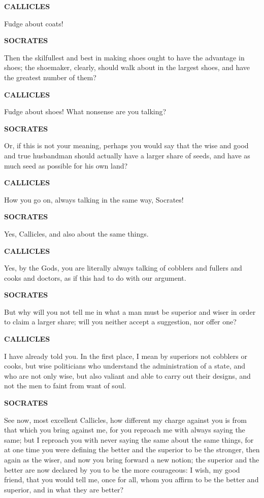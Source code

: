 \documentclass[11pt,letter]{article}
\begin{document}
\par \textbf{CALLICLES}
\par   Fudge about coats!

\par \textbf{SOCRATES}
\par   Then the skilfullest and best in making shoes ought to have the advantage in shoes; the shoemaker, clearly, should walk about in the largest shoes, and have the greatest number of them?

\par \textbf{CALLICLES}
\par   Fudge about shoes! What nonsense are you talking?

\par \textbf{SOCRATES}
\par   Or, if this is not your meaning, perhaps you would say that the wise and good and true husbandman should actually have a larger share of seeds, and have as much seed as possible for his own land?

\par \textbf{CALLICLES}
\par   How you go on, always talking in the same way, Socrates!

\par \textbf{SOCRATES}
\par   Yes, Callicles, and also about the same things.

\par \textbf{CALLICLES}
\par   Yes, by the Gods, you are literally always talking of cobblers and fullers and cooks and doctors, as if this had to do with our argument.

\par \textbf{SOCRATES}
\par   But why will you not tell me in what a man must be superior and wiser in order to claim a larger share; will you neither accept a suggestion, nor offer one?

\par \textbf{CALLICLES}
\par   I have already told you. In the first place, I mean by superiors not cobblers or cooks, but wise politicians who understand the administration of a state, and who are not only wise, but also valiant and able to carry out their designs, and not the men to faint from want of soul.

\par \textbf{SOCRATES}
\par   See now, most excellent Callicles, how different my charge against you is from that which you bring against me, for you reproach me with always saying the same; but I reproach you with never saying the same about the same things, for at one time you were defining the better and the superior to be the stronger, then again as the wiser, and now you bring forward a new notion; the superior and the better are now declared by you to be the more courageous:  I wish, my good friend, that you would tell me, once for all, whom you affirm to be the better and superior, and in what they are better?
\end{document}
